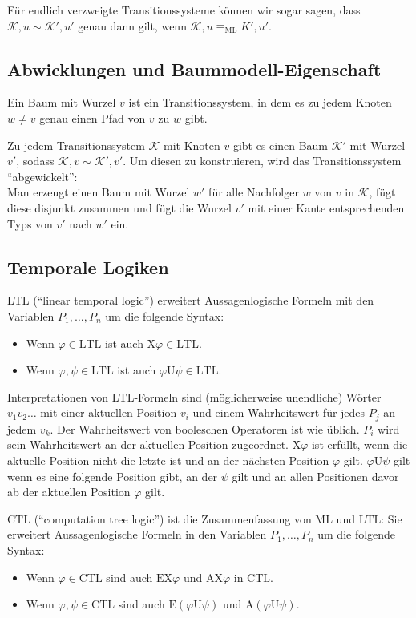 \documentclass[a4paper,parskip=half*,DIV=15,fontsize=11pt]{scrartcl}
\newcommand{\K}{\mathcal{K}}
\newcommand{\ML}{\mathrm{ML}}
\newcommand{\LTL}{\mathrm{LTL}}
\newcommand{\CTL}{\mathrm{CTL}}
\newcommand{\X}{\mathrm{X}}
\newcommand{\until}{\mathrm{U}}
\begin{document}
Für endlich verzweigte Transitionssysteme können wir sogar sagen, dass $\K, u \sim \K', u'$ genau dann gilt, wenn $\K, u \equiv_\ML K', u'$.

\subsection{Abwicklungen und Baummodell-Eigenschaft}

Ein Baum mit Wurzel $v$ ist ein Transitionssystem, in dem es zu jedem Knoten $w \ne v$ genau einen Pfad von $v$ zu $w$ gibt.

Zu jedem Transitionssystem $\K$ mit Knoten $v$ gibt es einen Baum $\K'$ mit Wurzel $v'$, sodass $\K, v \sim \K', v'$. Um diesen zu konstruieren, wird das Transitionssystem ``abgewickelt'':    \\
Man erzeugt einen Baum mit Wurzel $w'$ für alle Nachfolger $w$ von $v$ in $\K$, fügt diese disjunkt zusammen und fügt die Wurzel $v'$ mit einer Kante entsprechenden Typs von $v'$ nach $w'$ ein.

\subsection{Temporale Logiken}

$\LTL$ (``linear temporal logic'') erweitert Aussagenlogische Formeln mit den Variablen $P_1,\ldots,P_n$ um die folgende Syntax:
\begin{itemize}
\item Wenn $\varphi \in \LTL$ ist auch $\X\varphi \in \LTL$.
\item Wenn $\varphi, \psi \in \LTL$ ist auch $\varphi \until \psi \in \LTL$.
\end{itemize}

Interpretationen von $\LTL$-Formeln sind (möglicherweise unendliche) Wörter $v_1v_2\ldots$ mit einer aktuellen Position $v_i$ und einem Wahrheitswert für jedes $P_j$ an jedem $v_k$. Der Wahrheitswert von booleschen Operatoren ist wie üblich. $P_i$ wird sein Wahrheitswert an der aktuellen Position zugeordnet. $\X\varphi$ ist erfüllt, wenn die aktuelle Position nicht die letzte ist und an der nächsten Position $\varphi$ gilt. $\varphi\until\psi$ gilt wenn es eine folgende Position gibt, an der $\psi$ gilt und an allen Positionen davor ab der aktuellen Position $\varphi$ gilt.

$\CTL$ (``computation tree logic'') ist die Zusammenfassung von $\ML$ und $\LTL$: Sie erweitert Aussagenlogische Formeln in den Variablen $P_1,\ldots,P_n$ um die folgende Syntax:
\begin{itemize}
\item Wenn $\varphi \in \CTL$ sind auch $\mathrm{E}\X\varphi$ und $\mathrm{A}\X\varphi$ in $\CTL$.
\item Wenn $\varphi, \psi \in \CTL$ sind auch $\mathrm{E}(\varphi \until \psi)$ und $\mathrm{A}(\varphi\until\psi)$.
\end{itemize}
\end{document}

